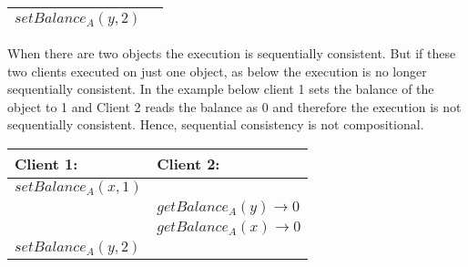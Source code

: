 \documentclass[a4paper]{article}
\begin{document}
{\begin{center}
\begin{tabular}{| l | l |}
      $setBalance_A(y, 2)$ &\\\hline
    \end{tabular}
  \end{center}
   When there are two objects the execution is sequentially consistent. But if these two clients executed on just one object, as below the execution is no longer sequentially consistent. In the example below client 1 sets the balance of the object to 1 and Client 2 reads the balance as 0 and therefore the execution is not sequentially consistent. Hence, sequential consistency is not compositional. 
  \begin{center}
    \begin{tabular}{| l | l |}\hline
      Client 1: & Client 2: \\\hline
      $setBalance_A(x, 1)$ &\\
      & $getBalance_A(y) \rightarrow 0$\\
      & $getBalance_A(x) \rightarrow 0$\\
      $setBalance_A(y, 2)$ &\\\hline
    \end{tabular}
  \end{center}
}
\end{document}
